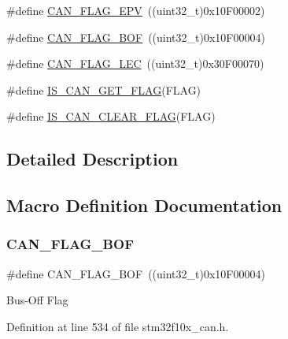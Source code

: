 \begin{DoxyCompactItemize}
\#define \hyperlink{group___c_a_n__flags_ga61954e54995f638ed78281ad2b0cf43a}{C\+A\+N\+\_\+\+F\+L\+A\+G\+\_\+\+E\+PV}~((uint32\+\_\+t)0x10\+F00002)
\item 
\#define \hyperlink{group___c_a_n__flags_ga65f20612d0bf1692003882c0cdbadb1c}{C\+A\+N\+\_\+\+F\+L\+A\+G\+\_\+\+B\+OF}~((uint32\+\_\+t)0x10\+F00004)
\item 
\#define \hyperlink{group___c_a_n__flags_ga73a774fa4d391aec0ea6552bf9372917}{C\+A\+N\+\_\+\+F\+L\+A\+G\+\_\+\+L\+EC}~((uint32\+\_\+t)0x30\+F00070)
\item 
\#define \hyperlink{group___c_a_n__flags_ga38d33d1762ed3a331d214cdb3249866e}{I\+S\+\_\+\+C\+A\+N\+\_\+\+G\+E\+T\+\_\+\+F\+L\+AG}(F\+L\+AG)
\item 
\#define \hyperlink{group___c_a_n__flags_gac46f5fb953efb6163cf3b2e33a514d0c}{I\+S\+\_\+\+C\+A\+N\+\_\+\+C\+L\+E\+A\+R\+\_\+\+F\+L\+AG}(F\+L\+AG)
\end{DoxyCompactItemize}


\subsection{Detailed Description}


\subsection{Macro Definition Documentation}
\mbox{\label{group___c_a_n__flags_ga65f20612d0bf1692003882c0cdbadb1c}} 
\subsubsection{\texorpdfstring{C\+A\+N\+\_\+\+F\+L\+A\+G\+\_\+\+B\+OF}{CAN\_FLAG\_BOF}}
{\footnotesize\ttfamily \#define C\+A\+N\+\_\+\+F\+L\+A\+G\+\_\+\+B\+OF~((uint32\+\_\+t)0x10\+F00004)}

Bus-\/\+Off Flag 

Definition at line 534 of file stm32f10x\+\_\+can.\+h.

\mbox{\label{group___c_a_n__flags_ga61954e54995f638ed78281ad2b0cf43a}} 
